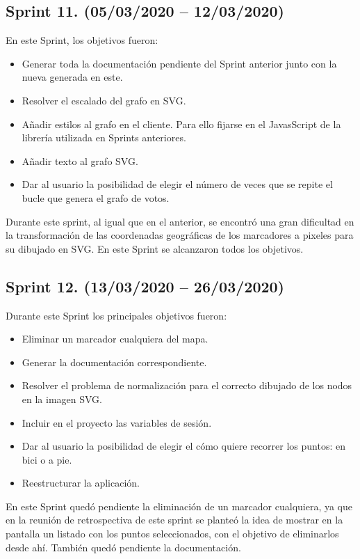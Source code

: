 \subsection{Sprint 11. (05/03/2020 -- 12/03/2020)}
En este Sprint, los objetivos fueron:
\begin{itemize}
	\item Generar toda la documentación pendiente del Sprint anterior junto con la nueva generada en este.
	\item Resolver el escalado del grafo en SVG.
	\item Añadir estilos al grafo en el cliente. Para ello fijarse en el JavasScript de la librería utilizada en Sprints anteriores.
	\item Añadir texto al grafo SVG.
	\item Dar al usuario la posibilidad de elegir el número de veces que se repite el bucle que genera el grafo de votos.
\end{itemize}
Durante este sprint, al igual que en el anterior, se encontró una gran dificultad en la transformación de las coordenadas geográficas de los marcadores a pixeles para su dibujado en SVG.
En este Sprint se alcanzaron todos los objetivos.

\subsection{Sprint 12. (13/03/2020 -- 26/03/2020)}
Durante este Sprint los principales objetivos fueron:
\begin{itemize}
	\item Eliminar un marcador cualquiera del mapa.
	\item Generar la documentación correspondiente.
	\item Resolver el problema de normalización para el correcto dibujado de los nodos en la imagen SVG.
	\item Incluir en el proyecto las variables de sesión.
	\item Dar al usuario la posibilidad de elegir el cómo quiere recorrer los puntos: en bici o a pie.
	\item Reestructurar la aplicación.
\end{itemize}
En este Sprint quedó pendiente la eliminación de un marcador cualquiera, ya que en la reunión de retrospectiva de este sprint se planteó la idea de mostrar en la pantalla un listado con los puntos seleccionados, con el objetivo de eliminarlos desde ahí. También quedó pendiente la documentación.

